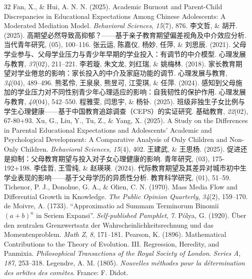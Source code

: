 \documentclass[zihao = -4, linespread = 1.5]{article}
\newcommand{\itsongti}[1]{{\JiangChengXieSongTi#1}}
\begin{document}
\begin{thebibliography}{32}
     Fan, X., \& Hui, A. N. N. (2025). Academic Burnout and Parent-Child Discrepancies in Educational Expectations Among Chinese Adolescents: A Moderated Mediation Model. \textit{Behavioral Sciences}, \textit{15}(7), 876.
     李文哲, \& 胡开. (2025). 高期望必然导致高抑郁？——基于亲子教育期望偏差视角及中介效应分析. \itsongti{当代青年研究}, (05), 100--116.
     张云运, 陈嘉仪, 杨妙, 任萍, \& 刘思辰. (2021). 父母学业参与、父母学业压力与青少年早期的学业投入：有调节的中介模型. \itsongti{心理发展与教育}, \textit{37}(02), 211--221.
     李若璇, 朱文龙, 刘红瑞, \& 姚梅林. (2018). 家长教育期望对学业倦怠的影响：家长投入的中介及家庭功能的调节. \itsongti{心理发展与教育}, \textit{34}(04), 489--496.
     熊茗伶, 王泉泉, 熊昱可, 江雯琪, \& 任萍. (2024). 感知到父母施加的学业压力对不同性别青少年心理适应的影响：自我韧性的保护作用. \itsongti{心理发展与教育}, \textit{40}(04), 542--550.
     程雅雯, 闫思宇, \& 杨钋. (2025). 班级非独生子女比例与学生心理健康——基于中国教育追踪调查（CEPS）的实证研究. \itsongti{基础教育}, \textit{22}(02), 67-80+93.
     Xu, G., Liu, Y., Tu, Z., \& Yang, X. (2025). A Study on the Differences in Parental Educational Expectations and Adolescents' Academic and Psychological Development: A Comparative Analysis of Only Children and Non-Only Children. \textit{Behavioral Sciences}, \textit{15}(4), 402.
     王建武, \& 王思杨. (2025). 促进还是抑制：父母教育期望与投入对子女心理健康的影响. \itsongti{青年研究}, (03), 175-192+198.
     李佳哲, 王雪纯, \& 赵瑛瑛. (2024). 代际教育期望及其差异对城市初中生学业表现的影响——基于父母学历的异质性分析. \itsongti{教育科学研究}, (01), 51--59.
     Tichenor, P. J., Donohue, G. A., \& Olien, C. N. (1970). Mass Media Flow and Differential Growth in Knowledge. \textit{The Public Opinion Quarterly}, \textit{34}(2), 159--170.
     de Moivre, A. (1733). ``Approximatio ad Summam Terminorum Binomii $\displaystyle(a+b)^n$ in Seriem Expansi''. \textit{Self-published Pamphlet}, \textit{7}.
     P\'olya, G. (1920). \"Uber den zentralen Grenzwertsatz der Wahrscheinlichkeitsrechnung und das Momentenproblem. \textit{Math Z}, \textit{8}, 171--181.
     Pearson, K. (1896). Mathematical Contributions to the Theory of Evolution. III. Regression, Heredity, and Panmixia. \textit{Philosophical Transactions of the Royal Society of London}. \textit{Series A}, \textit{187}, 253--318.
     Legendre, A. M. (1805). \textit{Nouvelles m{\'e}thodes pour la d{\'e}termination des orbites des com{\`e}tes}. France: F. Didot.
\end{thebibliography}
\end{document}
